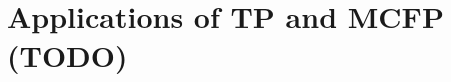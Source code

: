 \documentclass[../../main.tex]{subfiles}
\begin{document}
\section{Applications of TP and MCFP (TODO)}





\end{document}

